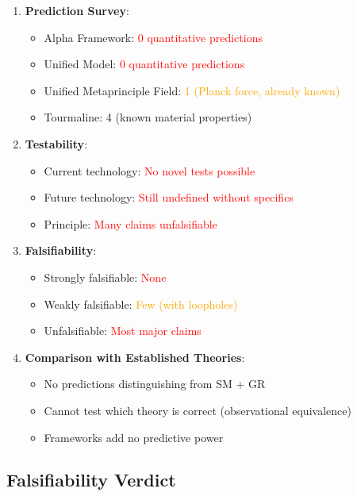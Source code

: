 \begin{enumerate}
    \item \textbf{Prediction Survey}:
    \begin{itemize}
        \item Alpha Framework: \textcolor{red}{0 quantitative predictions}
        \item Unified Model: \textcolor{red}{0 quantitative predictions}
        \item Unified Metaprinciple Field: \textcolor{orange}{1 (Planck force, already known)}
        \item Tourmaline: \textcolor{validcolor}{4 (known material properties)}
    \end{itemize}

    \item \textbf{Testability}:
    \begin{itemize}
        \item Current technology: \textcolor{red}{No novel tests possible}
        \item Future technology: \textcolor{red}{Still undefined without specifics}
        \item Principle: \textcolor{red}{Many claims unfalsifiable}
    \end{itemize}

    \item \textbf{Falsifiability}:
    \begin{itemize}
        \item Strongly falsifiable: \textcolor{red}{None}
        \item Weakly falsifiable: \textcolor{orange}{Few (with loopholes)}
        \item Unfalsifiable: \textcolor{red}{Most major claims}
    \end{itemize}

    \item \textbf{Comparison with Established Theories}:
    \begin{itemize}
        \item No predictions distinguishing from SM + GR
        \item Cannot test which theory is correct (observational equivalence)
        \item Frameworks add no predictive power
    \end{itemize}
\end{enumerate}

\subsection{Falsifiability Verdict}

